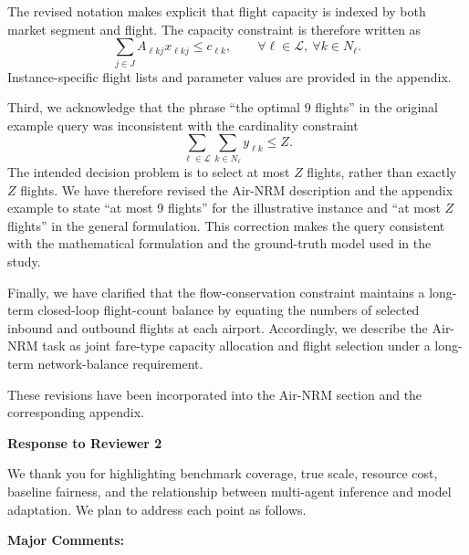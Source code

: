 \documentclass[11pt]{article}
\begin{document}
\begin{enumerate}[label=(R1.Major.\arabic*),leftmargin=*]
The revised notation makes explicit that flight capacity is indexed by both market segment and flight. The capacity constraint is therefore written as
\[
\sum_{j\in J} A_{\ell kj}x_{\ell kj}
\leq c_{\ell k},
\qquad
\forall \ell\in\mathcal{L},\ \forall k\in N_\ell.
\]
Instance-specific flight lists and parameter values are provided in the appendix.

Third, we acknowledge that the phrase ``the optimal 9 flights'' in the original example query was inconsistent with the cardinality constraint
\[
\sum_{\ell\in\mathcal{L}}
\sum_{k\in N_\ell}
y_{\ell k}
\leq Z.
\]
The intended decision problem is to select at most $Z$ flights, rather than exactly $Z$ flights. We have therefore revised the Air-NRM description and the appendix example to state ``at most 9 flights'' for the illustrative instance and ``at most $Z$ flights'' in the general formulation. This correction makes the query consistent with the mathematical formulation and the ground-truth model used in the study.

Finally, we have clarified that the flow-conservation constraint maintains a long-term closed-loop flight-count balance by equating the numbers of selected inbound and outbound flights at each airport. Accordingly, we describe the Air-NRM task as joint fare-type capacity allocation and flight selection under a long-term network-balance requirement.

These revisions have been incorporated into the Air-NRM section and the corresponding appendix.

\end{enumerate}

\newpage
\begin{center}
{\LARGE\textbf{Response to Reviewer 2}}
\end{center}

We thank you for highlighting benchmark coverage, true scale, resource cost, baseline fairness, and the relationship between multi-agent inference and model adaptation. We plan to address each point as follows.

\noindent\textbf{Major Comments:}
\end{document}
